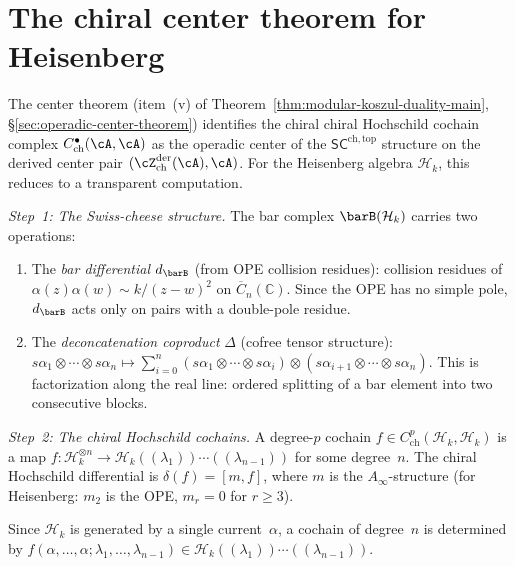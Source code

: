 \section{The chiral center theorem for Heisenberg}
\label{sec:frame-center-theorem}

The center theorem (item~(v) of
Theorem~\ref{thm:modular-koszul-duality-main},
\S\ref{sec:operadic-center-theorem}) identifies the chiral
chiral Hochschild cochain complex $C^\bullet_{\mathrm{ch}}(\cA,\cA)$
as the operadic center of the $\mathsf{SC}^{\mathrm{ch,top}}$
structure on the derived center pair
$(\cZ^{\mathrm{der}}_{\mathrm{ch}}(\cA),\cA)$. For the
Heisenberg algebra $\mathcal{H}_k$, this reduces to a transparent
computation.

\begin{computation}
\label{comp:heisenberg-center}

\emph{Step~1: The Swiss-cheese structure.}
The bar complex $\barB(\mathcal{H}_k)$ carries two operations:
\begin{enumerate}[label=\textup{(\alph*)}]
\item The \emph{bar differential} $d_{\barB}$ (from OPE collision residues):
 collision residues of $\alpha(z)\alpha(w) \sim k/(z-w)^2$ on
 $\overline{C}_n(\mathbb{C})$. Since the OPE has no simple pole,
 $d_{\barB}$ acts only on pairs with a double-pole residue.
\item The \emph{deconcatenation coproduct} $\Delta$ (cofree tensor structure):
 $s\alpha_1 \otimes \cdots \otimes s\alpha_n \mapsto
 \sum_{i=0}^n
 (s\alpha_1 \otimes \cdots \otimes s\alpha_i)
 \otimes
 (s\alpha_{i+1} \otimes \cdots \otimes s\alpha_n)$.
 This is factorization along the real line:
 ordered splitting of a bar element into two consecutive blocks.
\end{enumerate}

\emph{Step~2: The chiral Hochschild cochains.}
A degree-$p$ cochain $f \in C^p_{\mathrm{ch}}(\mathcal{H}_k,
\mathcal{H}_k)$ is a map
$f \colon \mathcal{H}_k^{\otimes n} \to
\mathcal{H}_k((\lambda_1))\cdots((\lambda_{n-1}))$
for some degree~$n$. The chiral Hochschild differential is
$\delta(f) = [m, f]$, where $m$ is the $A_\infty$-structure
(for Heisenberg: $m_2$ is the OPE, $m_r = 0$ for $r \geq 3$).

Since $\mathcal{H}_k$ is generated by a single current~$\alpha$,
a cochain of degree~$n$ is determined by
$f(\alpha, \ldots, \alpha; \lambda_1, \ldots, \lambda_{n-1})
\in \mathcal{H}_k((\lambda_1))\cdots((\lambda_{n-1}))$.


\end{computation}
